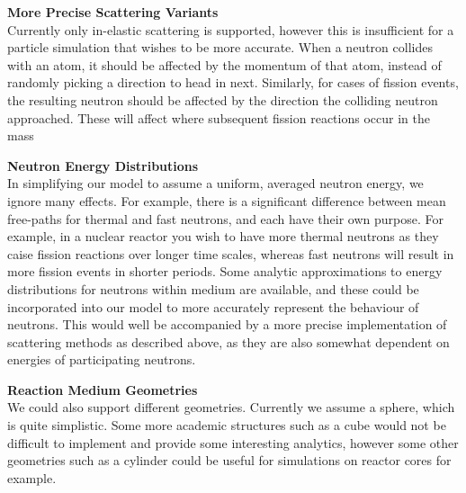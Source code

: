 \noindent\textbf{More Precise Scattering Variants} \\
Currently only in-elastic scattering is supported, however this is insufficient for a particle simulation that wishes to be 
more accurate. When a neutron collides 
with an atom, it should be affected by the momentum of that atom, instead of randomly picking a direction to head in next. Similarly, 
for cases of fission events, the resulting neutron should be affected by the direction the colliding neutron approached. These will 
affect where subsequent fission reactions occur in the mass

\noindent\textbf{Neutron Energy Distributions} \\
In simplifying our model to assume a uniform, averaged neutron energy, we ignore many effects. For example, there is a significant difference 
between mean free-paths for thermal and fast neutrons, and each have their own purpose. For example, in a nuclear reactor you wish to have 
more thermal neutrons as they caise fission reactions over longer time scales, whereas fast neutrons will result in more fission events 
in shorter periods. Some analytic approximations to energy distributions for neutrons within medium are available, and these could be incorporated 
into our model to more accurately represent the behaviour of neutrons. This would well be accompanied by a more precise implementation 
of scattering methods as described above, as they are also somewhat dependent on energies of participating neutrons.

\noindent\textbf{Reaction Medium Geometries} \\
We could also support different geometries. Currently we assume a sphere, which is quite simplistic. Some more academic 
structures such as a cube would not be difficult to implement and provide some interesting analytics, however some 
other geometries such as a cylinder could be useful for simulations on reactor cores for example.
